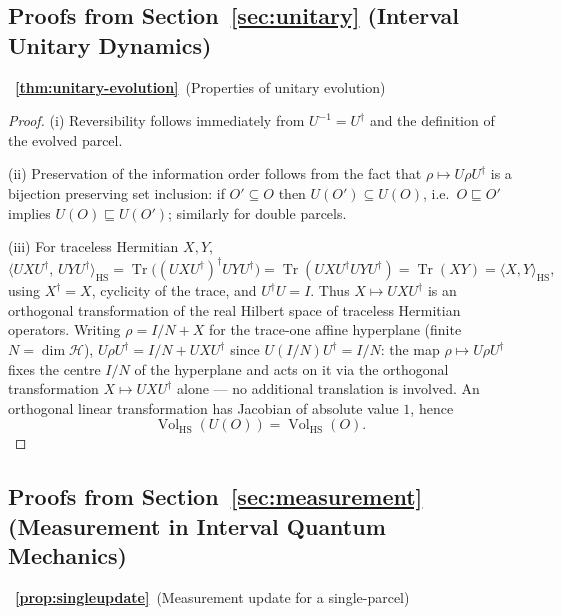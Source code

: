 \documentclass[11pt, onecolumn]{article}
\begin{document}
\subsection*{Proofs from Section~\ref{sec:unitary} (Interval Unitary Dynamics)}

~{\bf \ref{thm:unitary-evolution}}~(Properties of unitary evolution)

\begin{proof}
(i) Reversibility follows immediately from $U^{-1} = U^\dagger$ and the
definition of the evolved parcel.

(ii) Preservation of the information order follows from the fact that
$\rho \mapsto U\rho U^\dagger$ is a bijection preserving set inclusion: if
$O'\subseteq O$ then $U(O')\subseteq U(O)$, i.e.\ $O\sqsubseteq O'$
implies $U(O)\sqsubseteq U(O')$; similarly for double parcels.

(iii) For traceless Hermitian $X,Y$,
\[
\langle UXU^\dagger,\,UYU^\dagger\rangle_{\mathrm{HS}}
=
\operatorname{Tr}\bigl((UXU^\dagger)^\dagger UYU^\dagger\bigr)
=
\operatorname{Tr}(UXU^\dagger UYU^\dagger)
=
\operatorname{Tr}(XY)
=
\langle X,Y\rangle_{\mathrm{HS}},
\]
using $X^\dagger=X$, cyclicity of the trace, and $U^\dagger U=I$. Thus $X\mapsto UXU^\dagger$ is an orthogonal transformation of the real Hilbert space of traceless Hermitian operators. Writing $\rho=I/N+X$ for the trace-one affine hyperplane (finite $N=\dim\mathcal H$), $U\rho U^\dagger=I/N+UXU^\dagger$ since $U(I/N)U^\dagger=I/N$: the map $\rho\mapsto U\rho U^\dagger$ fixes the centre $I/N$ of the hyperplane and acts on it via the orthogonal transformation $X\mapsto UXU^\dagger$ alone — no additional translation is involved. An orthogonal linear transformation has Jacobian of absolute value $1$, hence
\[
\operatorname{Vol}_{\mathrm{HS}}(U(O))=\operatorname{Vol}_{\mathrm{HS}}(O).
\]
\end{proof}

\subsection*{Proofs from Section~\ref{sec:measurement} (Measurement in Interval Quantum Mechanics)}

~{\bf \ref{prop:singleupdate}}~(Measurement update for a single-parcel)
\end{document}
